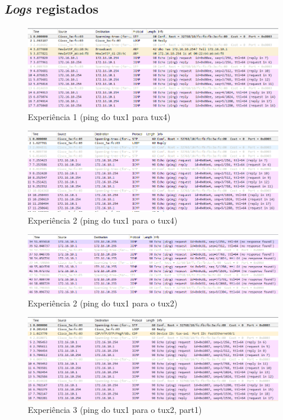 \documentclass{article}
\begin{document}
\subsection{\textit{Logs} registados}
\begin{figure}[H]
    \centering
    \includegraphics[scale=0.6]{images/exp1.PNG}
    \caption{Experiência 1 (ping do tux1 para tux4)}
    \label{fig:my_label}
\end{figure}
\begin{figure}
    \centering
    \includegraphics[scale=0.6]{images/exp2_1_4.PNG}
    \caption{Experiência 2 (ping do tux1 para o tux4)}
    \label{fig:my_label}
\end{figure}
\begin{figure}
    \centering
    \includegraphics[scale=0.6]{images/exp2_1_2.PNG}
    \caption{Experiência 2 (ping do tux1 para o tux2)}
    \label{fig:my_label}
\end{figure}
\begin{figure}
    \centering
    \includegraphics[scale=0.6]{images/exp3_part1.PNG}
    \caption{Experiência 3 (ping do tux1 para o tux2, part1)}
    \label{fig:my_label}
\end{figure}
\end{document}
